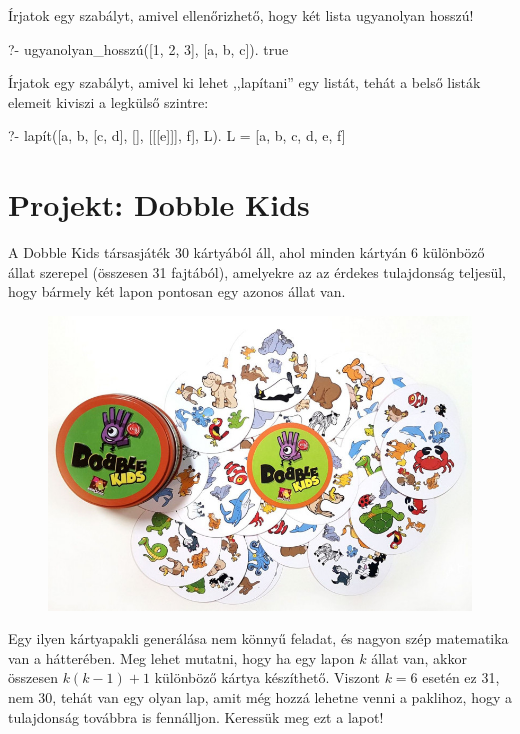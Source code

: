 \begin{problem}
Írjatok egy szabályt, amivel ellenőrizhető, hogy két
lista ugyanolyan hosszú!
\begin{query}
?- ugyanolyan_hosszú([1, 2, 3], [a, b, c]).
true
\end{query}
\end{problem}
\begin{problem}
Írjatok egy szabályt, amivel ki lehet ,,lapítani''
egy listát, tehát a belső listák elemeit kiviszi a
legkülső szintre:
\begin{query}
?- lapít([a, b, [c, d], [], [[[e]]], f], L).
L = [a, b, c, d, e, f]
\end{query}
\end{problem}
\section{Projekt: Dobble Kids}
A Dobble Kids társasjáték 30 kártyából áll, ahol
minden kártyán 6 különböző állat szerepel (összesen
31 fajtából), amelyekre az az érdekes tulajdonság
teljesül, hogy bármely két lapon pontosan egy azonos
állat van.
\begin{figure}[ht]
\begin{center}
\includegraphics[width=\textwidth]{images/dobble-kids.jpg}
\end{center}
\end{figure}
Egy ilyen kártyapakli generálása nem könnyű feladat,
és nagyon szép matematika van a hátterében. Meg
lehet mutatni, hogy ha egy lapon $k$ állat van,
akkor összesen $k(k-1)+1$ különböző kártya
készíthető. Viszont $k = 6$ esetén ez 31, nem 30,
tehát van egy olyan lap, amit még hozzá lehetne
venni a paklihoz, hogy a tulajdonság továbbra is
fennálljon. Keressük meg ezt a lapot!

